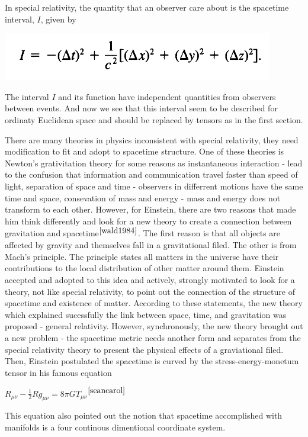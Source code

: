\documentclass[11pt,a4paper]{article}
\begin{document}
	In  special relativity, the quantity that an observer care about is the spacetime interval, $I$, given by
	\begin{center}
		\includegraphics[scale=0.4]{./InertialFrame.png}
	\end{center}
	The interval $I$ and its function  have independent quantities from observers between events. And now we see that this interval seem to be described for ordinaty Euclidean space and should be replaced  by tensors as in the first section. 
	
	There are many theories in physics inconsistent with special relativity,  they need modification to fit  and adopt to spacetime structure. One of these theories is Newton's grativitation theory for some reasons as instantaneous interaction - lead to the confusion that information and communication travel faster than speed of light,  separation of space and time  -  observers in differrent motions have the same time and space,  consevation of mass and energy -  mass and energy does not transform to each other. However, for Einstein, there are two reasons that made him think differently and look for a new theory to create a connection between gravitation and spacetime$^{\cite{wald1984}}$.
	The first reason is that all objects are affected by gravity and themselves fall in a gravitational filed. The other is from Mach's principle. The principle states all matters in the universe have their contributions to the local distribution of other matter around them. Einstein accepted and adopted to this idea and actively, strongly motivated to look for a theory,  not like special relativity, to point out the connection of the structure of spacetime and  existence of matter.  According to these statements, the new theory which explained sucessfully the link between space, time, and gravitation was proposed - general relativity. However,  synchronously, the new theory brought out a new problem - the spacetime metric needs another form and separates from  the special relativity theory to present the physical effects of a graviational filed. Then, Einstein postulated  the spacetime is curved by  the stress-energy-monetum tensor in his famous equation
	\begin{center}
		$R_{\mu\nu} - \frac{1}{2}Rg_{\mu\nu} = 8\pi G T_{\mu\nu}
		$$^{\cite{seancarol}}$
	\end{center}
	This equation also pointed out the notion that spacetime accomplished with manifolds is a  four continous dimentional  coordinate system.
\end{document}
